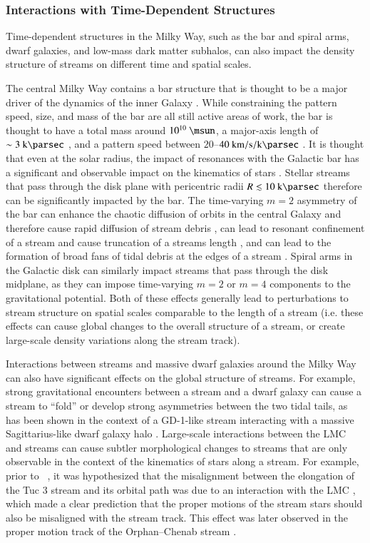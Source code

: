 \documentclass[final,5p,times,twocolumn,authoryear]{elsarticle}
\begin{document}
\subsubsection{Interactions with Time-Dependent Structures}

Time-dependent structures in the Milky Way, such as the bar and spiral arms, dwarf
galaxies, and low-mass dark matter subhalos, can also impact the density structure of
streams on different time and spatial scales.

The central Milky Way contains a bar structure that is thought to be a major driver of
the dynamics of the inner Galaxy \citep[e.g.,][]{blitz, wegg, gerhard}.
While constraining the pattern speed, size, and mass of the bar are all still active
areas of work, the bar is thought to have a total mass around $10^{10}~\unit{\msun}$, a
major-axis length of $\sim 3~\kpc$ \citep{wegg, portail}, and a pattern speed between
$20$--$40~\unit{\kms\per\kpc}$ \citep{todo}.
It is thought that even at the solar radius, the impact of resonances with the Galactic
bar has a significant and observable impact on the kinematics of stars
\citep[e.g.,][]{dehnen, etc}.
Stellar streams that pass through the disk plane with pericentric radii $R \lesssim
10~\kpc$ therefore can be significantly impacted by the bar.
The time-varying $m=2$ asymmetry of the bar can enhance the chaotic diffusion of orbits
in the central Galaxy and therefore cause rapid diffusion of stream debris
\citep{price-whelan:2016b}, can lead to resonant confinement of a stream and cause
truncation of a streams length \citep{hattori:2016}, and can lead to the formation of
broad fans of tidal debris at the edges of a stream \citep{pearson:2017}.
Spiral arms in the Galactic disk can similarly impact streams that pass through the disk
midplane, as they can impose time-varying $m=2$ or $m=4$ components to the gravitational
potential.
Both of these effects generally lead to perturbations to stream structure on spatial
scales comparable to the length of a stream (i.e. these effects can cause global changes
to the overall structure of a stream, or create large-scale density variations along the
stream track).

Interactions between streams and massive dwarf galaxies around the Milky Way can also
have significant effects on the global structure of streams.
For example, strong gravitational encounters between a stream and a dwarf galaxy can
cause a stream to ``fold'' or develop strong asymmetries between the two tidal tails, as
has been shown in the context of a GD-1-like stream interacting with a massive
Sagittarius-like dwarf galaxy halo \citep{dillamore:2022}.
Large-scale interactions between the LMC and streams can cause subtler morphological
changes to streams that are only observable in the context of the kinematics of stars
along a stream.
For example, prior to \gaia\ , it was hypothesized that the misalignment between
the elongation of the Tuc 3 stream and its orbital path was due to an interaction with
the LMC \citep{erkal:2018}, which made a clear prediction that the proper motions of the
stream stars should also be misaligned with the stream track.
This effect was later observed in the proper motion track of the Orphan--Chenab stream
\citep{koposov:2019, erkal:2019}.
\end{document}
